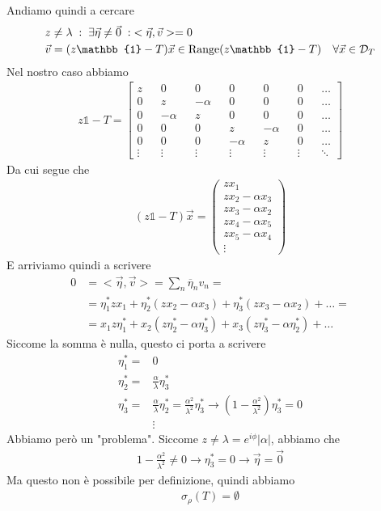 Andiamo quindi a cercare 
\begin{align}
	&z\neq \lambda \taleche \exists \vec{\eta} \neq \vec{0} \taleche <\vec{\eta} , \vec{v}> =0 \\
	&\vec{v} = (z\mathbb{1} - T)\vec{x} \in \text{Range}(z\mathbb{1} - T) \quad \forall \vec{x}\in \mathcal{D}_T
\end{align}
Nel nostro caso abbiamo
\begin{align}
	z\mathbb{1} - T= 
	\begin{bmatrix}
		z      && 0       && 0       && 0       && 0       && 0      && \dots\\
		0      && z       && -\alpha && 0       && 0       && 0      && \dots\\
		0 	   && -\alpha && z       && 0       && 0       && 0      && \dots\\
		0      && 0       && 0       && z       && -\alpha && 0      && \dots\\
		0 	   && 0       && 0       && -\alpha && z       && 0      && \dots\\
		\vdots && \vdots  && \vdots  && \vdots  && \vdots  && \vdots && \ddots
	\end{bmatrix}
\end{align}
Da cui segue che
\begin{align}
	(z\mathbb{1} - T)\vec{x} = \left( \begin{matrix}
		zx_1\\
		zx_2 - \alpha x_3\\
		zx_3 - \alpha x_2\\
		zx_4 - \alpha x_5\\
		zx_5 - \alpha x_4\\
		\vdots
	\end{matrix} \right)
\end{align}
E arriviamo quindi a scrivere
\begin{align}
	0 &= <\vec{\eta}, \vec{v} > = \sum_{n} \overline{\eta}_n v_n = \nonumber\\
	&= \eta_1^*zx_1 + \eta_2^*(zx_2 - \alpha x_3) + \eta_3^*(zx_3 - \alpha x_2) + \dots = \nonumber \\
	&= x_1z\eta_1^* + x_2(z\eta_2^* - \alpha \eta_3^*) + x_3(z\eta_3^* - \alpha \eta_2^*) + \dots
\end{align}
Siccome la somma è nulla, questo ci porta a scrivere
\begin{align}
	\eta^*_1 =& 0 \\
	\eta^*_2 =& \frac{\alpha}{\lambda} \eta^*_3\\
	\eta^*_3 =& \frac{\alpha}{\lambda} \eta^*_2 = \frac{\alpha^2}{\lambda^2} \eta^*_3 \to  \left(1-\frac{\alpha^2}{\lambda^2}\right) \eta^*_3 = 0\\
	&\vdots \nonumber
\end{align}
Abbiamo però un "problema". Siccome $z \neq \lambda = e^{i\phi} |\alpha|$, abbiamo che
\begin{align}
	1-\frac{\alpha^2}{\lambda^2} \neq 0 \to \eta_3^* = 0 \to \vec{\eta} = \vec{0}
\end{align}
Ma questo non è possibile per definizione, quindi abbiamo
\begin{align}
	\sigma_\rho(T) = \emptyset
\end{align}

